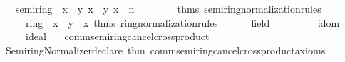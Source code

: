\begin{isabellebody}
\ \ \ \ {\isacharbraceleft}{\kern0pt}semiring\ {\isacharequal}{\kern0pt}\ {\isacharparenleft}{\kern0pt}{\isacharbrackleft}{\kern0pt}\isactrlterm {\isasymopen}x\ {\isacharplus}{\kern0pt}\ y{\isasymclose}{\isacharcomma}{\kern0pt}\ \isactrlterm {\isasymopen}x\ {\isacharasterisk}{\kern0pt}\ y{\isasymclose}{\isacharcomma}{\kern0pt}\ \isactrlterm {\isasymopen}x\ {\isacharcircum}{\kern0pt}\ n{\isasymclose}{\isacharcomma}{\kern0pt}\ \ \isanewline
\ \ \ \ \ \ {\isacharat}{\kern0pt}{\isacharbraceleft}{\kern0pt}thms\ semiring{\isacharunderscore}{\kern0pt}normalization{\isacharunderscore}{\kern0pt}rules{\isacharbraceright}{\kern0pt}{\isacharparenright}{\kern0pt}{\isacharcomma}{\kern0pt}\isanewline
\ \ \ \ \ \ ring\ {\isacharequal}{\kern0pt}\ {\isacharparenleft}{\kern0pt}{\isacharbrackleft}{\kern0pt}\isactrlterm {\isasymopen}x\ {\isacharminus}{\kern0pt}\ y{\isasymclose}{\isacharcomma}{\kern0pt}\ \isactrlterm {\isasymopen}{\isacharminus}{\kern0pt}\ x{\isasymclose}{\isacharbrackright}{\kern0pt}{\isacharcomma}{\kern0pt}\ {\isacharat}{\kern0pt}{\isacharbraceleft}{\kern0pt}thms\ ring{\isacharunderscore}{\kern0pt}normalization{\isacharunderscore}{\kern0pt}rules{\isacharbraceright}{\kern0pt}{\isacharparenright}{\kern0pt}{\isacharcomma}{\kern0pt}\isanewline
\ \ \ \ \ \ field\ {\isacharequal}{\kern0pt}\ {\isacharparenleft}{\kern0pt}{\isacharbrackleft}{\kern0pt}{\isacharbrackright}{\kern0pt}{\isacharcomma}{\kern0pt}\ {\isacharbrackleft}{\kern0pt}{\isacharbrackright}{\kern0pt}{\isacharparenright}{\kern0pt}{\isacharcomma}{\kern0pt}\isanewline
\ \ \ \ \ \ idom\ {\isacharequal}{\kern0pt}\ {\isacharbrackleft}{\kern0pt}{\isacharbrackright}{\kern0pt}{\isacharcomma}{\kern0pt}\isanewline
\ \ \ \ \ \ ideal\ {\isacharequal}{\kern0pt}\ {\isacharbrackleft}{\kern0pt}{\isacharbrackright}{\kern0pt}{\isacharbraceright}{\kern0pt}\isanewline
{\isacartoucheclose}%
\endisatagML
{\isafoldML}%
%
\isadelimML
\isanewline
%
\endisadelimML
\isanewline
{}\isamarkupfalse%
\isanewline
\isanewline
{}\isamarkupfalse%
\ comm{\isacharunderscore}{\kern0pt}semiring{\isacharunderscore}{\kern0pt}{}{\isacharunderscore}{\kern0pt}cancel{\isacharunderscore}{\kern0pt}crossproduct\isanewline
{}\isanewline
%
\isadelimML
\isanewline
%
\endisadelimML
%
\isatagML
{}\isamarkupfalse%
\ {\isacartoucheopen}\isanewline
\ \ Semiring{\isacharunderscore}{\kern0pt}Normalizer{\isachardot}{\kern0pt}declare\ {\isacharat}{\kern0pt}{\isacharbraceleft}{\kern0pt}thm\ comm{\isacharunderscore}{\kern0pt}semiring{\isacharunderscore}{\kern0pt}{}{\isacharunderscore}{\kern0pt}cancel{\isacharunderscore}{\kern0pt}crossproduct{\isacharunderscore}{\kern0pt}axioms{\isacharbraceright}{\kern0pt}\isanewline

\end{isabellebody}

